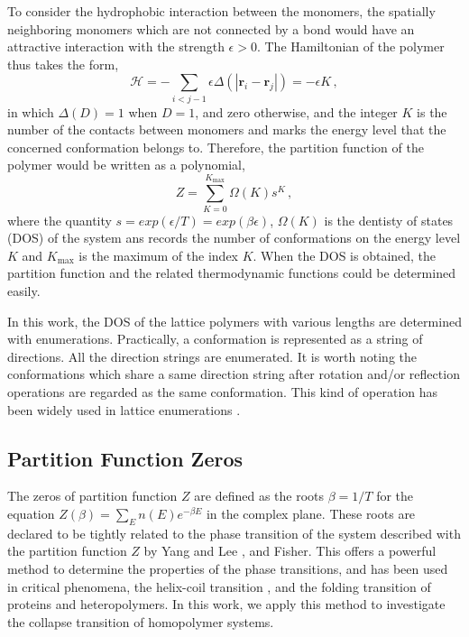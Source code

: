 \documentclass[preprint,preprintnumbers,amsmath,amssymb,showpacs,aps,pre]{revtex4-1}
\begin{document}
To consider the hydrophobic interaction between the monomers, the spatially
neighboring monomers which are not connected by a bond would have an
attractive interaction with the strength $\epsilon>0$. The Hamiltonian of
the polymer thus takes the form,
\begin{equation}
{\mathcal H}=-\sum_{i<j-1}\epsilon \Delta(|{\mathbf r}_i-{\mathbf r}_j|)=
-\epsilon K \, ,
\end{equation}
in which $\Delta(D)=1$ when $D=1$, and zero otherwise, and the integer $K$
is the number of the contacts between monomers and marks the energy level
that the concerned conformation belongs to. Therefore, the partition
function of the polymer would be written as a polynomial,
\begin{equation}
Z=\sum_{K=0}^{K_{\text{max}}} \Omega(K) s^K \, ,
\end{equation}
where the quantity $s=exp(\epsilon/T)=exp(\beta\epsilon)$, $\Omega(K)$ is
the dentisty of states (DOS) of the system ans records the number 
of conformations on the energy level $K$ and $K_{\text{max}}$ is the
maximum of the index $K$. When the DOS is obtained, the partition function
and the related thermodynamic functions could be determined easily.

In this work, the DOS of the lattice polymers with various lengths are
determined with enumerations. Practically, a conformation is represented
as a string of directions. All the direction strings are enumerated. It is
worth noting the conformations which share a same direction string after
rotation and/or reflection operations are regarded as the same conformation.
This kind of operation has been widely used in lattice enumerations
\cite{CieplakPRL98,PandePRL96}.

\subsection{Partition Function Zeros}

The zeros of partition function $Z$ are defined as the roots $\beta=1/T$
for the equation $Z(\beta)=\sum_E n(E)e^{-\beta E}$ in the complex plane.
These roots are declared to be tightly related to the phase transition
of the system described with the partition function $Z$ by Yang and Lee
\cite{LYPR52}, and Fisher\cite{FisherBook}. This offers a powerful method
to determine the properties of the phase transitions, and has been used
in critical phenomena\cite{LipowskiIJMPB05}, the helix-coil transition
\cite{HansmannPRL00,HansmannPA01}, and the folding transition of
proteins and heteropolymers\cite{WangJCP03,ChenPA05}.
In this work, we apply this method to investigate
the collapse transition of homopolymer systems.
\end{document}
